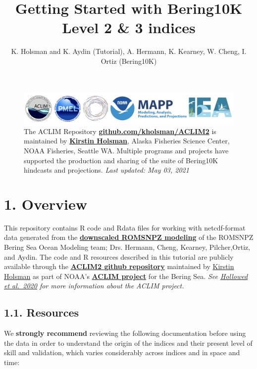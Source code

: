 \documentclass[
]{article}
\title{Getting Started with Bering10K Level 2 \& 3 indices}
\author{K. Holsman and K. Aydin (Tutorial), A. Hermann, K. Kearney, W. Cheng, I.
Ortiz (Bering10K)}
\date{}
\begin{document}
\maketitle

{
\setcounter{tocdepth}{2}
\tableofcontents
}
\begin{figure}
\centering
\includegraphics[width=1\textwidth,height=\textheight]{Figs/logos2.jpg}
\caption{The ACLIM Repository
\href{https://github.com/kholsman/ACLIM2}{\textbf{github.com/kholsman/ACLIM2}}
is maintained by \textbf{\href{mailto:kirstin.holsman@noaa.gov}{Kirstin
Holsman}}, Alaska Fisheries Science Center, NOAA Fisheries, Seattle WA.
Multiple programs and projects have supported the production and sharing
of the suite of Bering10K hindcasts and projections. \emph{Last updated:
May 03, 2021}}
\end{figure}

\hypertarget{overview}{%
\section{1. Overview}\label{overview}}

This repository contains R code and Rdata files for working with
netcdf-format data generated from the
\href{https://beringnpz.github.io/roms-bering-sea}{\textbf{downscaled
ROMSNPZ modeling}} of the ROMSNPZ Bering Sea Ocean Modeling team; Drs.
Hermann, Cheng, Kearney, Pilcher,Ortiz, and Aydin. The code and R
resources described in this tutorial are publicly available through the
\href{https://github.com/kholsman/ACLIM2}{\textbf{ACLIM2 github
repository}} maintained by
\href{mailto:kirstin.holsman@noaa.gov}{Kirstin Holsman} as part of
NOAA's
\href{https://www.fisheries.noaa.gov/alaska/ecosystems/alaska-climate-integrated-modeling-project}{\textbf{ACLIM
project}} for the Bering Sea. \emph{See
\href{https://www.frontiersin.org/articles/10.3389/fmars.2019.00775/full}{Hollowed
et al.~2020} for more information about the ACLIM project.}

\hypertarget{resources}{%
\subsection{1.1. Resources}\label{resources}}

We \textbf{strongly recommend} reviewing the following documentation
before using the data in order to understand the origin of the indices
and their present level of skill and validation, which varies
considerably across indices and in space and time:
\end{document}
